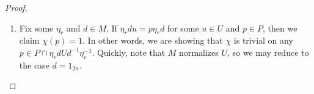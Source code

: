 \begin{proof}
\begin{enumerate}
		For the remainder of the proof, our goal will be to show that $f\in\mc H$ will have $f(\eta_rd)=0$ for any $d\in M$ whenever $r\ne n$. This will complete the proof because it shows that any $f\in\mc H$ is supported on $P\eta_nP=P\eta_nU$, meaning that $f=f(\eta_n)f_{\chi,T}$, so $\left\{f_{\chi,T}\right\}$ is a basis of $\mc H$. %

		The basic sketch is that we will find various $u\in U$ such that $\eta_rdu=p\eta_rd$ for some $p\in P$, which will allow us to show that $f(\eta_rd)=f(\eta_rdu)$, but then $f(\eta_rd)\ne0$ would imply $\psi_T(u)=1$. Having many such $u$ will allow us to force a full column of $T$ to vanish, violating the hypothesis that $T$ is invertible.


		\item Fix some $\eta_r$ and $d\in M$. If $\eta_rdu=p\eta_rd$ for some $u\in U$ and $p\in P$, then we claim $\chi(p)=1$. In other words, we are showing that $\chi$ is trivial on any $p\in P\cap\eta_rdUd^{-1}\eta_r^{-1}$. Quickly, note that $M$ normalizes $U$, so we may reduce to the case $d=1_{2n}$.


\end{enumerate}
\end{proof}
